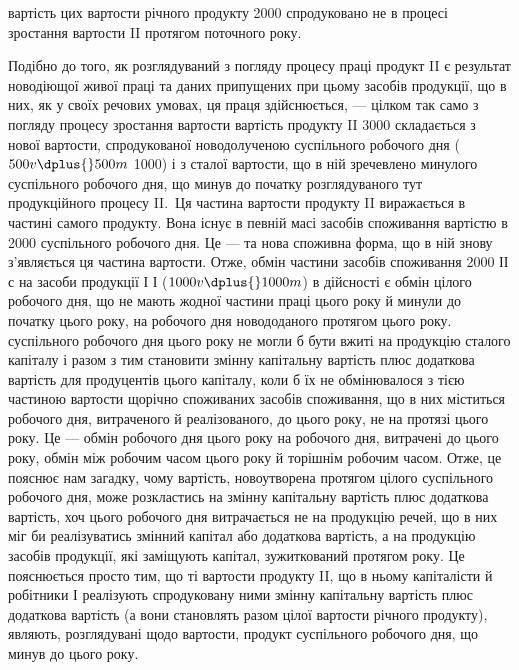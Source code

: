 \parcont{}  %
вартість цих  вартости річного продукту \deq{} 2000 спродуковано не
в процесі зростання вартости II протягом поточного року.

Подібно до того, як розглядуваний з погляду процесу праці продукт
II є результат новодіющої живої праці та даних припущених при цьому
засобів продукції, що в них, як у своїх речових умовах, ця праця здійснюється,
— цілком так само з погляду процесу зростання вартости вартість
продукту II \deq{} 3000 складається з нової вартости, спродукованої новодолученою
 суспільного робочого дня ($500 v \dplus{} 500m$ \deq{} 1000) і з сталої
вартости, що в ній зречевлено  минулого суспільного робочого дня,
що минув до початку розглядуваного тут продукційного процесу II.~Ця
частина вартости продукту II виражається в частині самого продукту.
Вона існує в певній масі засобів споживання вартістю в 2000 \deq{}  суспільного
робочого дня. Це — та нова споживна форма, що в ній знову
з’являється ця частина вартости. Отже, обмін частини засобів споживання \deq{}
2000 ІІ $с$ на засоби продукції І \deq{} І ($1000 v \dplus{} 1000 m$) в дійсності є обмін
 цілого робочого дня, що не мають жодної частини праці цього року
й минули до початку цього року, на  робочого дня новододаного протягом
цього року.  суспільного робочого дня цього року не могли б
бути вжиті на продукцію сталого капіталу і разом з тим становити змінну
капітальну вартість плюс додаткова вартість для продуцентів цього капіталу,
коли б їх не обмінювалося з тією частиною вартости щорічно
споживаних засобів споживання, що в них міститься  робочого дня,
витраченого й реалізованого, до цього року, не на протязі цього
року. Це — обмін  робочого дня цього року на  робочого дня,
витрачені до цього року, обмін між робочим часом цього року й
торішнім робочим часом. Отже, це пояснює нам загадку, чому вартість,
новоутворена протягом цілого суспільного робочого дня, може розкластись
на змінну капітальну вартість плюс додаткова вартість, хоч
 цього робочого дня витрачається не на продукцію речей, що в
них міг би реалізуватись змінний капітал або додаткова вартість, а
на продукцію засобів продукції, які заміщують капітал, зужиткований
протягом року. Це пояснюється просто тим, що ті  вартости продукту
II, що в ньому капіталісти й робітники І реалізують спродуковану
ними змінну капітальну вартість плюс додаткова вартість (а вони
становлять разом  цілої вартости річного продукту), являють, розглядувані
щодо вартости, продукт  суспільного робочого дня, що
минув до цього року.

